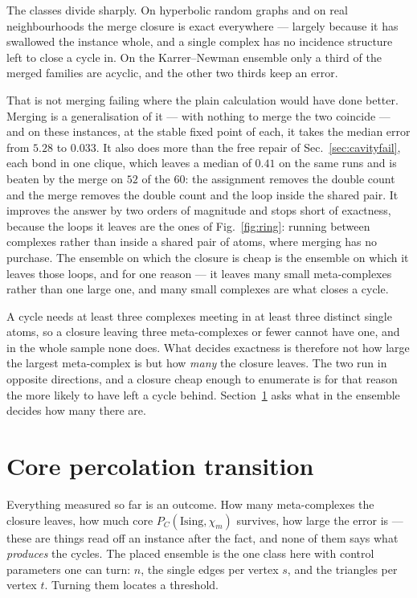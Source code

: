 The classes divide sharply. On hyperbolic random graphs and on real
neighbourhoods the merge closure is exact everywhere --- largely because it has
swallowed the instance whole, and a single complex has no
incidence structure left to close a cycle in. On the Karrer--Newman ensemble
only a third of the merged families are acyclic, and the other two thirds keep
an error.

That is not merging failing where the plain calculation would have done better.
Merging is a generalisation of it --- with nothing to merge the two coincide ---
and on these instances, at the stable fixed point of each, it takes the
median error from $5.28$ to $0.033$. It also does more than the free repair of
Sec.~\ref{sec:cavityfail}, each bond in one clique, which leaves a median of
$0.41$ on the same runs and is beaten by the merge on $52$ of the $60$: the
assignment removes the double count and the merge removes the double count
and the loop inside the shared pair. It improves the answer by two orders of
magnitude and stops short of exactness, because the
loops it leaves are the ones of Fig.~\ref{fig:ring}: running between complexes
rather than inside a shared pair of atoms, where merging has no purchase. The
ensemble on which the closure is cheap is the ensemble on which it leaves those
loops, and for one reason --- it leaves many small meta-complexes rather than
one large one, and many small complexes are what closes a cycle.

A cycle needs at least three complexes meeting in at least three distinct single
atoms, so a closure leaving three meta-complexes or fewer cannot have one, and in
the whole sample none does. What decides exactness is therefore not how large
the largest meta-complex is but how \emph{many} the closure leaves. The two run in opposite directions, and a
closure cheap enough to enumerate is for that reason the more likely to have
left a cycle behind. Section~\ref{sec:coretransition} asks what in the ensemble
decides how many there are.

\section{Core percolation transition}
\label{sec:coretransition}

Everything measured so far is an outcome. How many meta-complexes the closure
leaves, how much core $P_{C}(\mathrm{Ising},\chi_{m})$ survives, how large the error is --- these are things read
off an instance after the fact, and none of them says what \emph{produces} the
cycles. The placed ensemble is the one class here with control parameters one
can turn: $n$, the single edges per vertex $s$, and the triangles per vertex
$t$. Turning them locates a threshold.

